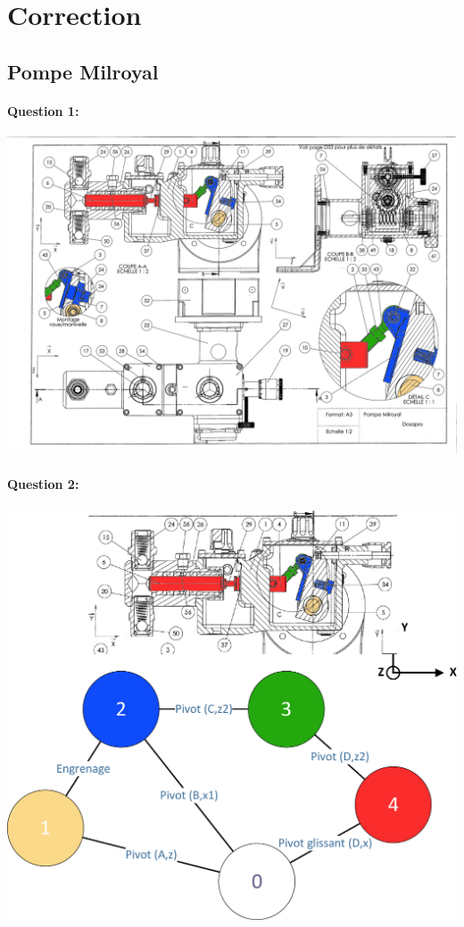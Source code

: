 \ifdef{\public}{}{}

\newpage

\pagestyle{correction}

\section{Correction}

\subsection{Pompe Milroyal}

\paragraph{Question 1:}

\begin{center}
 \includegraphics[width=0.9\linewidth]{img/Milroyal_mobilites}
\end{center}

\paragraph{Question 2:}

\begin{center}
 \includegraphics[width=0.65\linewidth]{img/Liaisons}
\end{center}

